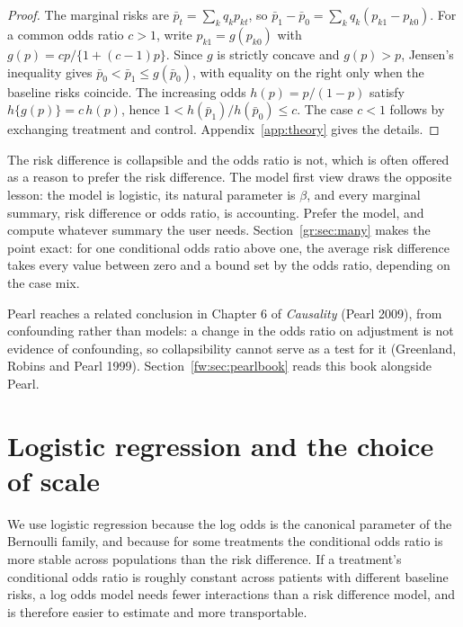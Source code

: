 \begin{proof}
The marginal risks are $\bar p_t = \sum_k q_k p_{kt}$, so $\bar p_1 - \bar p_0 = \sum_k q_k(p_{k1} - p_{k0})$. For a common odds ratio $c > 1$, write $p_{k1} = g(p_{k0})$ with $g(p) = cp/\{1 + (c - 1)p\}$. Since $g$ is strictly concave and $g(p) > p$, Jensen's inequality gives $\bar p_0 < \bar p_1 \le g(\bar p_0)$, with equality on the right only when the baseline risks coincide. The increasing odds $h(p) = p/(1 - p)$ satisfy $h\{g(p)\} = c\,h(p)$, hence $1 < h(\bar p_1)/h(\bar p_0) \le c$. The case $c < 1$ follows by exchanging treatment and control. Appendix~\ref{app:theory} gives the details.
\end{proof}

The risk difference is collapsible and the odds ratio is not, which is often offered as a reason to prefer the risk difference. The model first view draws the opposite lesson: the model is logistic, its natural parameter is $\beta$, and every marginal summary, risk difference or odds ratio, is accounting. Prefer the model, and compute whatever summary the user needs. Section~\ref{gr:sec:many} makes the point exact: for one conditional odds ratio above one, the average risk difference takes every value between zero and a bound set by the odds ratio, depending on the case mix.

Pearl reaches a related conclusion in Chapter 6 of \emph{Causality} (Pearl 2009), from confounding rather than models: a change in the odds ratio on adjustment is not evidence of confounding, so collapsibility cannot serve as a test for it (Greenland, Robins and Pearl 1999). Section~\ref{fw:sec:pearlbook} reads this book alongside Pearl.

\section{Logistic regression and the choice of scale}

We use logistic regression because the log odds is the canonical parameter of the Bernoulli family, and because for some treatments the conditional odds ratio is more stable across populations than the risk difference. If a treatment's conditional odds ratio is roughly constant across patients with different baseline risks, a log odds model needs fewer interactions than a risk difference model, and is therefore easier to estimate and more transportable.

